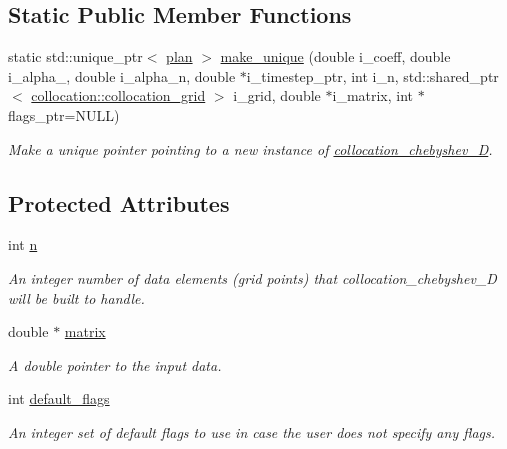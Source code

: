 \subsection*{Static Public Member Functions}
\begin{DoxyCompactItemize}
\item 
static std\-::unique\-\_\-ptr$<$ \hyperlink{classplan}{plan} $>$ \hyperlink{classdiffusion_1_1implicit__methods_1_1collocation__chebyshev__1_d_a49cd6f5839d1f969a99340b98b02de19}{make\-\_\-unique} (double i\-\_\-coeff, double i\-\_\-alpha\-\_, double i\-\_\-alpha\-\_\-n, double $\ast$i\-\_\-timestep\-\_\-ptr, int i\-\_\-n, std\-::shared\-\_\-ptr$<$ \hyperlink{classcollocation_1_1collocation__grid}{collocation\-::collocation\-\_\-grid} $>$ i\-\_\-grid, double $\ast$i\-\_\-matrix, int $\ast$flags\-\_\-ptr=N\-U\-L\-L)
\begin{DoxyCompactList}\small\item\em Make a unique pointer pointing to a new instance of \hyperlink{classdiffusion_1_1implicit__methods_1_1collocation__chebyshev__1_d}{collocation\-\_\-chebyshev\-\_\-D}. \end{DoxyCompactList}\end{DoxyCompactItemize}
\subsection*{Protected Attributes}
\begin{DoxyCompactItemize}
\item 
\hypertarget{classimplicit__plan_a8593daf1e4c9ac4736e4c8ddc039042d}{int \hyperlink{classimplicit__plan_a8593daf1e4c9ac4736e4c8ddc039042d}{n}}\label{classimplicit__plan_a8593daf1e4c9ac4736e4c8ddc039042d}

\begin{DoxyCompactList}\small\item\em An integer number of data elements (grid points) that collocation\-\_\-chebyshev\-\_\-D will be built to handle. \end{DoxyCompactList}\item 
\hypertarget{classimplicit__plan_a4a2d5f8e359650b877d1aef07053d8a6}{double $\ast$ \hyperlink{classimplicit__plan_a4a2d5f8e359650b877d1aef07053d8a6}{matrix}}\label{classimplicit__plan_a4a2d5f8e359650b877d1aef07053d8a6}

\begin{DoxyCompactList}\small\item\em A double pointer to the input data. \end{DoxyCompactList}\item 
\hypertarget{classplan_a14f8cce3065ed97f0909eda7b62ca1dc}{int \hyperlink{classplan_a14f8cce3065ed97f0909eda7b62ca1dc}{default\-\_\-flags}}\label{classplan_a14f8cce3065ed97f0909eda7b62ca1dc}

\begin{DoxyCompactList}\small\item\em An integer set of default flags to use in case the user does not specify any flags. \end{DoxyCompactList}\end{DoxyCompactItemize}


